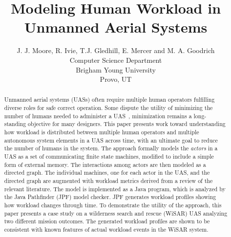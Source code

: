 \documentclass[letterpaper]{article}
\begin{document}
%
\title{Modeling Human Workload in Unmanned Aerial Systems}
\author{J. J. Moore, R. Ivie, T.J. Gledhill, E. Mercer and M. A. Goodrich\\
Computer Science Department \\ Brigham Young University \\ Provo, UT\\
}
\maketitle
\begin{abstract}
Unmanned aerial systems (UASs) often require multiple human operators fulfilling diverse roles for safe correct operation.  Some dispute the utility of minimizing the number of humans needed to administer a UAS~\cite{MurphyBurke2010}, minimization remains a long-standing objective for many designers.  This paper presents work toward understanding how workload is distributed between multiple human operators and multiple autonomous system elements in a UAS across time, with an ultimate goal to reduce the number of humans in the system. The approach formally models the {\em actors} in a UAS as a set of communicating finite state machines, modified to include a simple form of external memory. The interactions among actors are then modeled as a directed graph.  The individual machines, one for each actor in the UAS, and the directed graph are augmented with workload metrics derived from a review of the relevant literature. The model is implemented as a Java program, which is analyzed by the Java Pathfinder (JPF) model checker. JPF generates workload profiles showing how workload changes through time.  To demonstrate the utility of the approach, this paper presents a case study on a wilderness search and rescue (WiSAR) UAS analyzing two different mission outcomes. The generated workload profiles are shown to be consistent with known features of actual workload events in the WiSAR system. 
\end{abstract}

\noindent 




%





\end{document}
